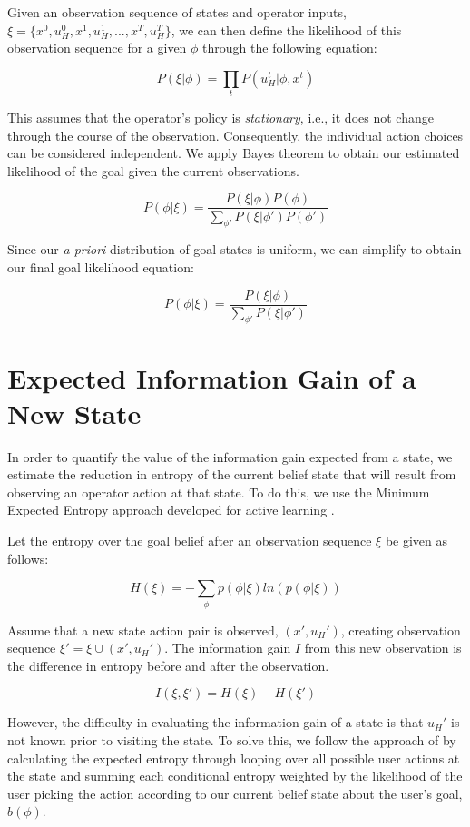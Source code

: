 \documentclass[a4paper]{article}
\begin{document}
Given an observation sequence of states and operator inputs, $\xi = \{x^0, u_H^0, x^1, u_H^1, ..., x^T, u_H^T\}$, we can then define the likelihood of this observation sequence for a given $\phi$ through the following equation:

\[
P(\xi|\phi) = \prod_tP(u_H^t|\phi, x^t)
\]

This assumes that the operator's policy is \textit{stationary}, i.e., it does not change through the course of the observation. Consequently, the individual action choices can be considered independent. We apply Bayes theorem to obtain our estimated likelihood of the goal given the current observations.

\[
P(\phi|\xi) = \frac{P(\xi|\phi)P(\phi)}{\sum_{\phi'}P(\xi|\phi')P(\phi')}
\]

Since our \textit{a priori} distribution of goal states is uniform, we can simplify to obtain our final goal likelihood equation:

\[
P(\phi|\xi) = \frac{P(\xi|\phi)}{\sum_{\phi'}P(\xi|\phi')}
\]

\section{Expected Information Gain of a New State}

In order to quantify the value of the information gain expected from a state, we estimate the reduction in entropy of the current belief state that will result from observing an operator action at that state. To do this, we use the Minimum Expected Entropy approach developed for active learning \cite{holub2008entropy}.

Let the entropy over the goal belief after an observation sequence $\xi$ be given as follows:

\[
H(\xi) = -\sum_\phi p(\phi|\xi)ln(p(\phi|\xi))
\]

Assume that a new state action pair is observed, $(x',u_H')$, creating observation sequence $\xi' = \xi \cup (x', u_H')$. The information gain $I$ from this new observation is the difference in entropy before and after the observation.

\[
I(\xi, \xi') = H(\xi) - H(\xi')
\]

However, the difficulty in evaluating the information gain of a state is that $u_H'$ is not known prior to visiting the state. To solve this, we follow the approach of \citet{holub2008entropy} by calculating the expected entropy through looping over all possible user actions at the state and summing each conditional entropy weighted by the likelihood of the user picking the action according to our current belief state about the user's goal, $b(\phi)$.
\end{document}
